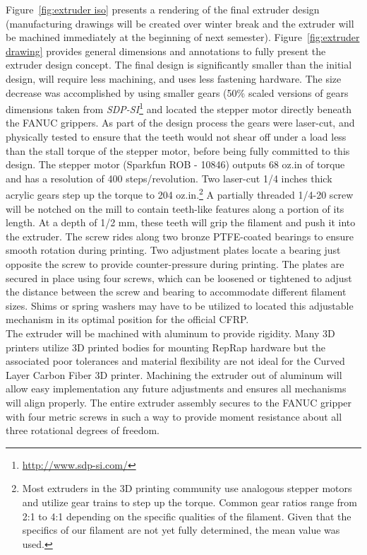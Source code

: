 Figure~\ref{fig:extruder iso} presents a rendering of the final extruder design (manufacturing drawings will be created over winter break and the extruder will be machined immediately at the beginning of next semester). Figure~\ref{fig:extruder drawing} provides general dimensions and annotations to fully present the extruder design concept. The final design is significantly smaller than the initial design, will require less machining, and uses less fastening hardware. The size decrease was accomplished by using smaller gears (50\% scaled versions of gears dimensions taken from \emph{SDP-SI}\footnote{\url{http://www.sdp-si.com/}} and located the stepper motor directly beneath the FANUC grippers. As part of the design process the gears were laser-cut, and physically tested to ensure that the teeth would not shear off under a load less than the stall torque of the stepper motor, before being fully committed to this design. The stepper motor (Sparkfun ROB - 10846) outputs 68 oz.in of torque and has a resolution of 400 steps/revolution. Two laser-cut 1/4 inches thick acrylic gears step up the torque to 204 oz.in.\footnote{Most extruders in the 3D printing community use analogous stepper motors and utilize gear trains to step up the torque. Common gear ratios range from 2:1 to 4:1 depending on the specific qualities of the filament. Given that the specifics of our filament are not yet fully determined, the mean value was used.} A partially threaded 1/4-20 screw will be notched on the mill to contain teeth-like features along a portion of its length. At a depth of 1/2 mm, these teeth will grip the filament and push it into the extruder. The screw rides along two bronze PTFE-coated bearings to ensure smooth rotation during printing. Two adjustment plates locate a bearing just opposite the screw to provide counter-pressure during printing. The plates are secured in place using four screws, which can be loosened or tightened to adjust the distance between the screw and bearing to accommodate different filament sizes. Shims or spring washers may have to be utilized to located this adjustable mechanism in its optimal position for the official CFRP.\\

The extruder will be machined with aluminum to provide rigidity. Many 3D printers utilize 3D printed bodies for mounting RepRap hardware but the associated poor tolerances and material flexibility are not ideal for the Curved Layer Carbon Fiber 3D printer. Machining the extruder out of aluminum will allow easy implementation any future adjustments and ensures all mechanisms will align properly. The entire extruder assembly secures to the FANUC gripper with four metric screws in such a way to provide moment resistance about all three rotational degrees of freedom.\\

